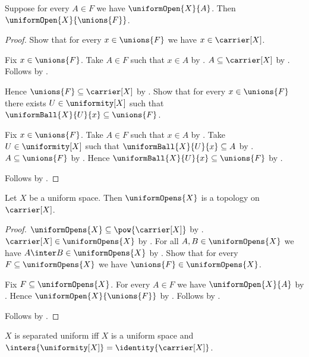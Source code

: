 \begin{theorem}\label{uniform_open_arbitrary_union}
    Suppose for every $A\in F$ we have $\uniformOpen{X}{A}$.
    Then $\uniformOpen{X}{\unions{F}}$.
\end{theorem}
\begin{proof}
    Show that for every $x\in\unions{F}$ we have $x\in\carrier[X]$.
    \begin{subproof}
        Fix $x\in\unions{F}$.
        Take $A\in F$ such that $x\in A$ by .
        $A\subseteq\carrier[X]$ by .
        Follows by .
    \end{subproof}
    Hence $\unions{F}\subseteq\carrier[X]$ by .
    Show that for every $x\in\unions{F}$ there exists
        $U\in\uniformity[X]$ such that
            $\uniformBall{X}{U}{x}\subseteq\unions{F}$.
    \begin{subproof}
        Fix $x\in\unions{F}$.
        Take $A\in F$ such that $x\in A$ by .
        Take $U\in\uniformity[X]$ such that
            $\uniformBall{X}{U}{x}\subseteq A$
            by .
        $A\subseteq\unions{F}$ by .
        Hence $\uniformBall{X}{U}{x}\subseteq\unions{F}$
            by .
    \end{subproof}
    Follows by .
\end{proof}

\begin{theorem}\label{uniform_opens_form_topology}
    Let $X$ be a uniform space.
    Then $\uniformOpens{X}$ is a topology on $\carrier[X]$.
\end{theorem}
\begin{proof}
    $\uniformOpens{X}\subseteq\pow{\carrier[X]}$
        by .
    $\carrier[X]\in\uniformOpens{X}$
        by .
    For all $A,B\in\uniformOpens{X}$ we have
        $A\inter B\in\uniformOpens{X}$
        by .
    Show that for every $F\subseteq\uniformOpens{X}$ we have
        $\unions{F}\in\uniformOpens{X}$.
    \begin{subproof}
        Fix $F\subseteq\uniformOpens{X}$.
        For every $A\in F$ we have $\uniformOpen{X}{A}$
            by .
        Hence $\uniformOpen{X}{\unions{F}}$
            by .
        Follows by .
    \end{subproof}
    Follows by .
\end{proof}

\begin{definition}\label{separated_uniform_space}
    $X$ is separated uniform iff
        $X$ is a uniform space and
        $\inters{\uniformity[X]}=\identity{\carrier[X]}$.
\end{definition}

